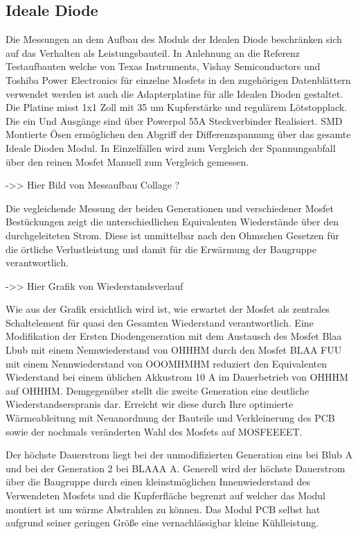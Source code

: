 \subsection{Ideale Diode}

Die Messungen an dem Aufbau des Moduls der Idealen Diode beschränken sich auf das Verhalten als Leistungsbauteil. 
In Anlehnung an die Referenz Testaufbauten welche von Texas Instruments, Vishay Semiconductors und Toshiba Power Electronics für einzelne Mosfets in den zugehörigen Datenblättern verwendet werden ist auch die Adapterplatine für alle Idealen Dioden gestaltet.
Die Platine misst 1x1 Zoll mit 35 um Kupferstärke und regulärem Lötstopplack. Die ein Und Ausgänge sind über Powerpol 55A Steckverbinder Realisiert. SMD Montierte Ösen ermöglichen den Abgriff der Differenzspannung über das gesamte Ideale Dioden Modul. In Einzelfällen wird zum Vergleich der Spannungsabfall über den reinen Mosfet Manuell zum Vergleich gemessen.

->> Hier Bild von Messaufbau  Collage ?


Die vegleichende Messung der beiden Generationen und verschiedener Mosfet Bestückungen zeigt die unterschiedlichen Equivalenten Wiederstände über den durchgeleiteten Strom.
Diese ist unmittelbar nach den Ohmschen Gesetzen für die örtliche Verlustleistung und damit für die Erwärmung der Baugruppe verantwortlich.


->> Hier Grafik von Wiederstandsverlauf

Wie aus der Grafik ersichtlich wird ist, wie erwartet der Mosfet als zentrales Schaltelement für quasi den Gesamten Wiederstand verantwortlich.
Eine Modifikation der Ersten Diodengeneration mit dem Austausch des Mosfet  Blaa Lbub  mit einem Nennwiederstand von OHHHM durch den Mosfet  BLAA FUU mit einem Nennwiederstand von OOOMHMHM  reduziert den Equivalenten Wiederstand bei einem üblichen Akkustrom 10 A im Dauerbetrieb von OHHHM  auf OHHHM.
Demgegenüber stellt die zweite Generation eine deutliche Wiederstandserspranis dar.
Erreicht wir diese durch Ihre optimierte Wärmeableitung mit Neuanordnung der Bauteile und Verkleinerung des PCB sowie der nochmals veränderten Wahl des Mosfets auf MOSFEEEET.

Der höchste Dauerstrom liegt bei der unmodifizierten Generation eins bei  Blub A  und bei der Generation 2 bei BLAAA A. 
Generell wird der höchste Dauerstrom über die Baugruppe durch einen kleinstmöglichen Innenwiederstand des Verwendeten Mosfets und die Kupferfläche begrenzt auf welcher das Modul montiert ist um wärme Abstrahlen zu können. Das Modul PCB selbst hat aufgrund seiner geringen Größe eine vernachlässigbar kleine Kühlleistung.

